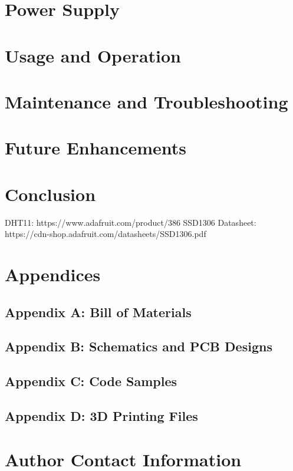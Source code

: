 \documentclass{article}
\begin{document}
\begin{multicols}{2}
		\section{Power Supply}
		\lipsum[47-49]
		
		\section{Usage and Operation}
		\lipsum[50-52]
		
		\section{Maintenance and Troubleshooting}
		\lipsum[53-55]
		
		\section{Future Enhancements}
		\lipsum[56-58]
		
		\section{Conclusion}
		\lipsum[59-61]	
		
		\begin{thebibliography}{X}
			 DHT11: https://www.adafruit.com/product/386
			 SSD1306 Datasheet: https://cdn-shop.adafruit.com/datasheets/SSD1306.pdf
		\end{thebibliography}	
	
		\section{Appendices}
		\lipsum[65-67]
		
		\subsection{Appendix A: Bill of Materials}
		
		\subsection{Appendix B: Schematics and PCB Designs}
		
		\subsection{Appendix C: Code Samples}
		
		\subsection{Appendix D: 3D Printing Files}
		
		\section{Author Contact Information}
		
	\end{multicols} %
	
\end{document}
